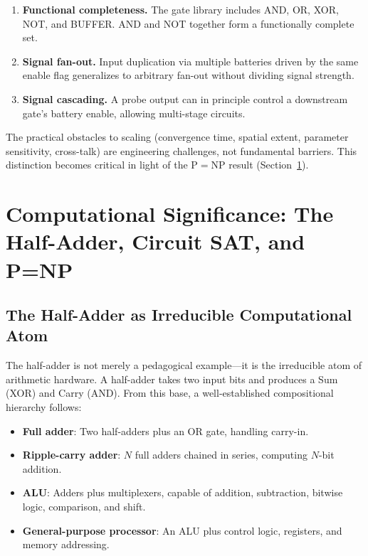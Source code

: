 \documentclass[11pt,a4paper]{article}
\begin{document}
\begin{enumerate}
    \item \textbf{Functional completeness.} The gate library includes AND, OR, XOR, NOT, and BUFFER. AND and NOT together form a functionally complete set.
    \item \textbf{Signal fan-out.} Input duplication via multiple batteries driven by the same enable flag generalizes to arbitrary fan-out without dividing signal strength.
    \item \textbf{Signal cascading.} A probe output can in principle control a downstream gate's battery enable, allowing multi-stage circuits.
\end{enumerate}

The practical obstacles to scaling (convergence time, spatial extent, parameter sensitivity, cross-talk) are engineering challenges, not fundamental barriers. This distinction becomes critical in light of the $\mathrm{P} = \mathrm{NP}$ result (Section~\ref{sec:computational}).


\section{Computational Significance: The Half-Adder, Circuit SAT, and P=NP}
\label{sec:computational}

\subsection{The Half-Adder as Irreducible Computational Atom}

The half-adder is not merely a pedagogical example---it is the irreducible atom of arithmetic hardware. A half-adder takes two input bits and produces a Sum (XOR) and Carry (AND). From this base, a well-established compositional hierarchy follows:

\begin{itemize}
    \item \textbf{Full adder}: Two half-adders plus an OR gate, handling carry-in.
    \item \textbf{Ripple-carry adder}: $N$ full adders chained in series, computing $N$-bit addition.
    \item \textbf{ALU}: Adders plus multiplexers, capable of addition, subtraction, bitwise logic, comparison, and shift.
    \item \textbf{General-purpose processor}: An ALU plus control logic, registers, and memory addressing.
\end{itemize}
\end{document}
